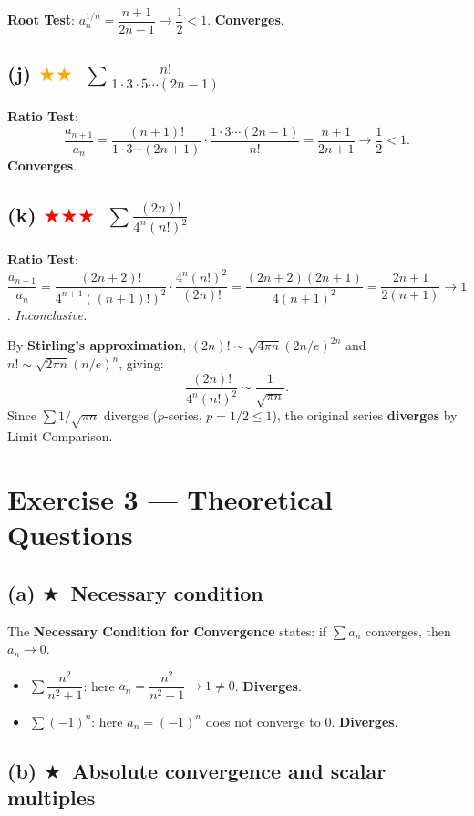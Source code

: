 \documentclass[12pt,a4paper]{article}
\newcommand{\easy}{\textcolor{green!60!black}{$\bigstar$}}
\newcommand{\medium}{\textcolor{orange}{$\bigstar\bigstar$}}
\newcommand{\hard}{\textcolor{red}{$\bigstar\bigstar\bigstar$}}
\begin{document}
\textbf{Root Test}: $a_n^{1/n} = \dfrac{n+1}{2n-1}\to\dfrac{1}{2}<1$. \textbf{Converges}.

\subsection*{(j) \medium\ $\displaystyle\sum\frac{n!}{1\cdot3\cdot5\cdots(2n-1)}$}

\textbf{Ratio Test}:
\[
  \frac{a_{n+1}}{a_n} = \frac{(n+1)!}{1\cdot3\cdots(2n+1)}\cdot\frac{1\cdot3\cdots(2n-1)}{n!}
  = \frac{n+1}{2n+1}\to\frac{1}{2}<1.
\]
\textbf{Converges}.

\subsection*{(k) \hard\ $\displaystyle\sum\frac{(2n)!}{4^n(n!)^2}$}

\textbf{Ratio Test}: $\dfrac{a_{n+1}}{a_n} = \dfrac{(2n+2)!}{4^{n+1}((n+1)!)^2}\cdot\dfrac{4^n(n!)^2}{(2n)!} = \dfrac{(2n+2)(2n+1)}{4(n+1)^2} = \dfrac{2n+1}{2(n+1)}\to 1$. \textit{Inconclusive.}

By \textbf{Stirling's approximation}, $(2n)!\sim\sqrt{4\pi n}(2n/e)^{2n}$ and $n!\sim\sqrt{2\pi n}(n/e)^n$, giving:
\[
  \frac{(2n)!}{4^n(n!)^2}\sim\frac{1}{\sqrt{\pi n}}.
\]
Since $\sum 1/\sqrt{\pi n}$ diverges ($p$-series, $p=1/2\leq 1$), the original series \textbf{diverges} by Limit Comparison.

\section*{Exercise 3 — Theoretical Questions}

\subsection*{(a) \easy\ Necessary condition}

The \textbf{Necessary Condition for Convergence} states: if $\sum a_n$ converges, then $a_n\to 0$.

\begin{itemize}
  \item $\sum \dfrac{n^2}{n^2+1}$: here $a_n = \dfrac{n^2}{n^2+1}\to 1\neq 0$. \textbf{Diverges}.
  \item $\sum (-1)^n$: here $a_n = (-1)^n$ does not converge to $0$. \textbf{Diverges}.
\end{itemize}

\subsection*{(b) \easy\ Absolute convergence and scalar multiples}
\end{document}
